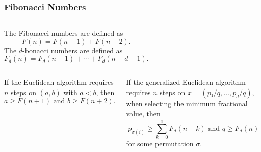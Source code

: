 \documentclass[aspectratio=169]{beamer}
\begin{document}
\begin{frame}
  \frametitle{Fibonacci Numbers}
  \small
  \begin{columns}[T]
    The Fibonacci numbers are defined as
    \[
      F(n) = F(n - 1) + F(n - 2).
    \]
    The $d$-bonacci numbers are defined as
    \[
      F_d(n) = F_d(n - 1) + ⋯ + F_d(n - d - 1).
    \]
  \end{columns}
  \vspace{1em}
  \begin{columns}[T]
    \begin{theorem}
      If the Euclidean algorithm requires $n$ steps on $(a, b)$ with $a < b$,
      then \[
        a ≥ F(n+1) \text{ and } b ≥ F(n+2).
      \]
    \end{theorem}

    \begin{theorem}
      If the generalized Euclidean algorithm requires $n$ steps on $x = (p₁/q, …, p_d/q)$,
      when selecting the \alert{minimum fractional value},
      then \[
        p_{σ(i)} ≥ ∑_{k=0}^i F_d(n-k) \text{ and } q ≥ F_d(n)
      \]
      for some permutation $σ$.
    \end{theorem}
  \end{columns}
\end{frame}
\end{document}

